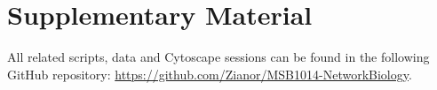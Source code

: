\section{Supplementary Material}

All related scripts, data and Cytoscape sessions can be found in the following GitHub repository: \url{https://github.com/Zianor/MSB1014-NetworkBiology}.